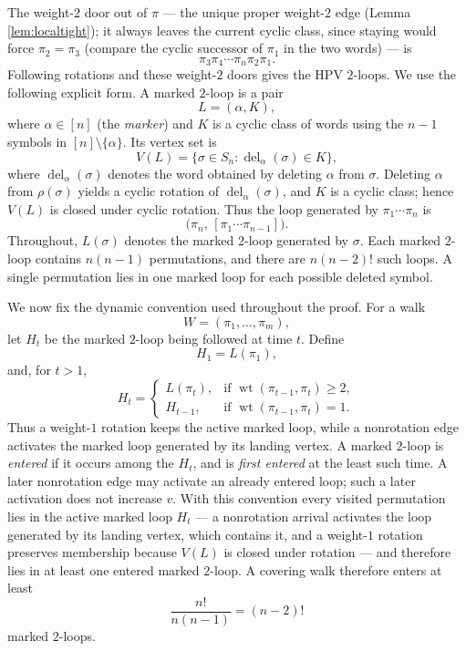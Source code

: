 \documentclass[11pt]{article}
\DeclareMathOperator{\wt}{wt}
\begin{document}
The weight-\(2\) door out of \(\pi\) --- the unique proper weight-\(2\) edge (Lemma
\ref{lem:localtight}); it always leaves the current cyclic class, since staying would force
\(\pi_2=\pi_3\) (compare the cyclic successor of \(\pi_1\) in the two words) --- is
\[
  \pi_3\pi_4\cdots\pi_n\pi_2\pi_1.
\]
Following rotations and these weight-\(2\) doors gives the HPV \(2\)-loops.  We use the following
explicit form.  A marked \(2\)-loop is a pair
\[
  L=(\alpha,K),
\]
where \(\alpha\in[n]\) (the \emph{marker}) and \(K\) is a cyclic class of words using the
\(n-1\) symbols in \([n]\setminus\{\alpha\}\).  Its vertex set is
\[
  V(L)=\{\sigma\in S_n:\operatorname{del}_\alpha(\sigma)\in K\},
\]
where \(\operatorname{del}_\alpha(\sigma)\) denotes the word obtained by deleting \(\alpha\) from \(\sigma\).
Deleting \(\alpha\) from \(\rho(\sigma)\) yields a cyclic rotation of \(\operatorname{del}_\alpha(\sigma)\),
and \(K\) is a cyclic class; hence \(V(L)\) is closed under cyclic rotation.
Thus the loop generated by \(\pi_1\cdots\pi_n\) is
\[
  \bigl(\pi_n,\,[\pi_1\cdots\pi_{n-1}]\bigr).
\]
Throughout, \(L(\sigma)\) denotes the marked \(2\)-loop generated by \(\sigma\).
Each marked \(2\)-loop contains \(n(n-1)\) permutations, and there are \(n(n-2)!\) such loops.  A
single permutation lies in one marked loop for each possible deleted symbol.

We now fix the dynamic convention used throughout the proof.  For a walk
\[
  W=(\pi_1,\ldots,\pi_m),
\]
let \(H_t\) be the marked \(2\)-loop being followed at time \(t\).  Define
\[
  H_1=L(\pi_1),
\]
and, for \(t>1\),
\[
  H_t=
  \begin{cases}
  L(\pi_t),&\text{if }\wt(\pi_{t-1},\pi_t)\ge2,\\
  H_{t-1},&\text{if }\wt(\pi_{t-1},\pi_t)=1.
  \end{cases}
\]
Thus a weight-\(1\) rotation keeps the active marked loop, while a nonrotation edge activates the
marked loop generated by its landing vertex.  A marked \(2\)-loop is \emph{entered} if it occurs
among the \(H_t\), and is \emph{first entered} at the least such time.  A later nonrotation edge may
activate an already entered loop; such a later activation does not increase \(v\).  With this
convention every visited permutation lies in the active marked loop \(H_t\) --- a nonrotation
arrival activates the loop generated by its landing vertex, which contains it, and a weight-\(1\)
rotation preserves membership because \(V(L)\) is closed under rotation --- and therefore lies in
at least one entered marked \(2\)-loop.  A covering walk therefore enters at least
\[
  \frac{n!}{n(n-1)}=(n-2)!
\]
marked \(2\)-loops.
\end{document}
